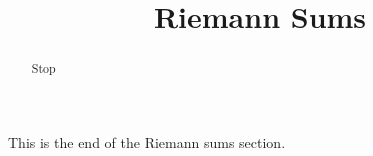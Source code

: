 \documentclass[handout]{ximera}
\title{Riemann Sums}
\begin{document}
\begin{abstract} Stop
\end{abstract}

\maketitle

This is the end of the Riemann sums section.
\end{document}
